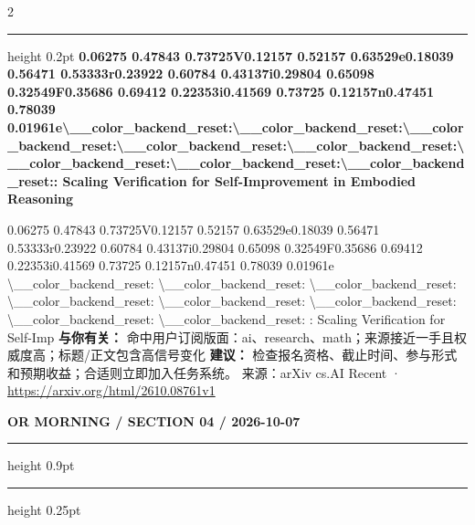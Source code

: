 \documentclass[10.5pt]{ctexart}
\begin{document}
\begin{multicols}{2}
\vspace{2mm}
\hrule height 0.2pt
\vspace{2mm}
{\large\bfseries 0.06275 0.47843 0.73725V0.12157 0.52157 0.63529e0.18039 0.56471 0.53333r0.23922 0.60784 0.43137i0.29804 0.65098 0.32549F0.35686 0.69412 0.22353i0.41569 0.73725 0.12157n0.47451 0.78039 0.01961e\textbackslash{}\_\_color\_backend\_reset:\textbackslash{}\_\_color\_backend\_reset:\textbackslash{}\_\_color\_backend\_reset:\textbackslash{}\_\_color\_backend\_reset:\textbackslash{}\_\_color\_backend\_reset:\textbackslash{}\_\_color\_backend\_reset:\textbackslash{}\_\_color\_backend\_reset:\textbackslash{}\_\_color\_backend\_reset:: Scaling Verification for Self-Improvement in Embodied Reasoning}\par
0.06275 0.47843 0.73725V0.12157 0.52157 0.63529e0.18039 0.56471 0.53333r0.23922 0.60784 0.43137i0.29804 0.65098 0.32549F0.35686 0.69412 0.22353i0.41569 0.73725 0.12157n0.47451 0.78039 0.01961e \textbackslash{}\_\_color\_backend\_reset: \textbackslash{}\_\_color\_backend\_reset: \textbackslash{}\_\_color\_backend\_reset: \textbackslash{}\_\_color\_backend\_reset: \textbackslash{}\_\_color\_backend\_reset: \textbackslash{}\_\_color\_backend\_reset: \textbackslash{}\_\_color\_backend\_reset: \textbackslash{}\_\_color\_backend\_reset: : Scaling Verification for Self-Imp
\textbf{与你有关：} 命中用户订阅版面：ai、research、math；来源接近一手且权威度高；标题/正文包含高信号变化
\textbf{建议：} 检查报名资格、截止时间、参与形式和预期收益；合适则立即加入任务系统。
{\footnotesize\color{ormuted} 来源：arXiv cs.AI Recent · \url{https://arxiv.org/html/2610.08761v1}}
\end{multicols}
\newpage
{\small\bfseries OR MORNING / SECTION 04 / 2026-10-07}
\vspace{2mm}
\hrule height 0.9pt
\vspace{1.5mm}
\hrule height 0.25pt
\vspace{4mm}
\end{document}
